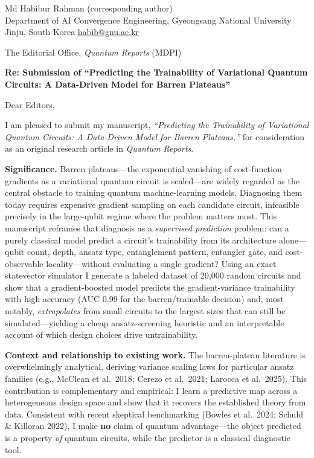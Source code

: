\documentclass[11pt]{article}
\begin{document}
{\raggedleft\small
Md Habibur Rahman (corresponding author) \\
Department of AI Convergence Engineering, Gyeongsang National University \\
Jinju, South Korea \quad\textbullet\quad \href{mailto:habib@gnu.ac.kr}{habib@gnu.ac.kr} \\[0.4em]
\par}

\noindent The Editorial Office, \textit{Quantum Reports} (MDPI)

\vspace{0.5em}

\noindent\textbf{Re: Submission of ``Predicting the Trainability of Variational
Quantum Circuits: A Data-Driven Model for Barren Plateaus''}

\vspace{0.3em}

\noindent Dear Editors,

I am pleased to submit my manuscript, \textit{``Predicting the Trainability of
Variational Quantum Circuits: A Data-Driven Model for Barren Plateaus,''} for
consideration as an original research article in \textit{Quantum Reports}.

\textbf{Significance.} Barren plateaus---the exponential vanishing of
cost-function gradients as a variational quantum circuit is scaled---are widely
regarded as the central obstacle to training quantum machine-learning models.
Diagnosing them today requires expensive gradient sampling on each candidate
circuit, infeasible precisely in the large-qubit regime where the problem matters
most. This manuscript reframes that diagnosis as a \emph{supervised prediction}
problem: can a purely classical model predict a circuit's trainability from its
architecture alone---qubit count, depth, ansatz type, entanglement pattern,
entangler gate, and cost-observable locality---without evaluating a single
gradient? Using an exact statevector simulator I generate a labeled dataset of
20{,}000 random circuits and show that a gradient-boosted model predicts the
gradient-variance trainability with high accuracy (AUC 0.99 for the
barren/trainable decision) and, most notably, \emph{extrapolates} from small
circuits to the largest sizes that can still be simulated---yielding a cheap
ansatz-screening heuristic and an interpretable account of which design choices
drive untrainability.

\textbf{Context and relationship to existing work.} The barren-plateau literature
is overwhelmingly analytical, deriving variance scaling laws for particular ansatz
families (e.g., McClean et al.\ 2018; Cerezo et al.\ 2021; Larocca et al.\ 2025).
This contribution is complementary and empirical: I learn a predictive map across a
heterogeneous design space and show that it recovers the established theory from
data. Consistent with recent skeptical benchmarking (Bowles et al.\ 2024;
Schuld \& Killoran 2022), I make \textbf{no} claim of quantum advantage---the
object predicted is a property \emph{of} quantum circuits, while the predictor is
a classical diagnostic tool.
\end{document}
